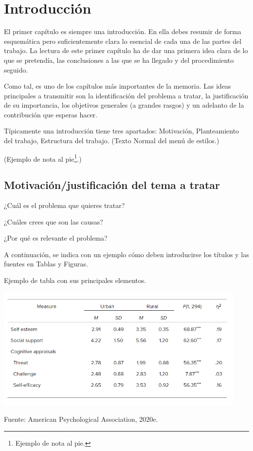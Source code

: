 \chapter{Introducción}

El primer capítulo es siempre una introducción. En ella debes resumir de forma esquemática pero suficientemente clara lo esencial de cada una de las partes del trabajo. La lectura de este primer capítulo ha de dar una primera idea clara de lo que se pretendía, las conclusiones a las que se ha llegado y del procedimiento seguido.

Como tal, es uno de los capítulos más importantes de la memoria. Las ideas principales a transmitir son la identificación del problema a tratar, la justificación de su importancia, los objetivos generales (a grandes rasgos) y un adelanto de la contribución que esperas hacer.

Típicamente una introducción tiene tres apartados: Motivación, Planteamiento del trabajo, Estructura del trabajo. (Texto Normal del menú de estilos.)

(Ejemplo de nota al pie\footnote{Ejemplo de nota al pie.}.)

\section{Motivación/justificación del tema a tratar}

¿Cuál es el problema que quieres tratar?

¿Cuáles crees que son las causas?

¿Por qué es relevante el problema?

A continuación, se indica con un ejemplo cómo deben introducirse los títulos y las fuentes en Tablas y Figuras.

\begin{table}[t]
	\begin{center}
	\caption{Ejemplo de tabla con sus principales elementos.}
	\label{tab:tab-1}
	\includegraphics[width=4.90737in,height=2.42708in]{tabla}

	\small Fuente: American Psychological Association, 2020e.
	\end{center}
\end{table}

